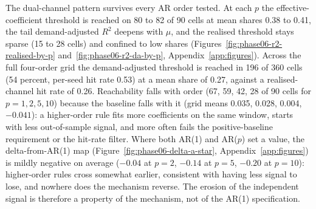 \documentclass[12pt]{article}
\begin{document}
The dual-channel pattern survives every AR order tested. At each $p$ the effective-coefficient threshold is reached on 80 to 82 of 90 cells at mean shares 0.38 to 0.41, the tail demand-adjusted $R^{2}$ deepens with $\mu$, and the realised threshold stays sparse (15 to 28 cells) and confined to low shares (Figures~\ref{fig:phase06-r2-realised-by-p} and~\ref{fig:phase06-r2-da-by-p}, Appendix~\ref{app:figures}). %
Across the full four-order grid the demand-adjusted threshold is reached in 196 of 360 cells (54 percent, per-seed hit rate 0.53) at a mean share of 0.27, against a realised-channel hit rate of 0.26. %
Reachability falls with order (67, 59, 42, 28 of 90 cells for $p=1, 2, 5, 10$) because the baseline falls with it (grid means 0.035, 0.028, 0.004, $-0.041$): a higher-order rule fits more coefficients on the same window, starts with less out-of-sample signal, and more often fails the positive-baseline requirement or the hit-rate filter. %
Where both AR(1) and AR($p$) set a value, the delta-from-AR(1) map (Figure~\ref{fig:phase06-delta-a-star}, Appendix~\ref{app:figures}) is mildly negative on average ($-0.04$ at $p=2$, $-0.14$ at $p=5$, $-0.20$ at $p=10$): higher-order rules cross somewhat earlier, consistent with having less signal to lose, and nowhere does the mechanism reverse. %
The erosion of the independent signal is therefore a property of the mechanism, not of the AR(1) specification.
\end{document}
